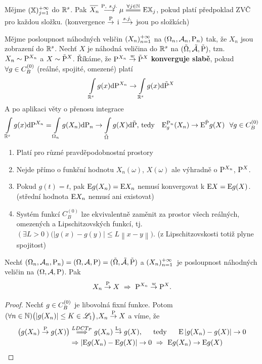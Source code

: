 \begin{remark}
	Mějme $(\mathbb{X})_{j=1}^{+\infty}$ do $\mathbb{R}^s$. Pak $\oxn \stackrel{\PP,~ s.j.}{\longrightarrow}\mu\equal{\forall j \in\N}\E \X_j$, pokud platí předpoklad ZVČ pro každou složku. (konvergence $\stackrel{\mathrm{P}}{\to}$ i $\stackrel{s.j.}{\longrightarrow}$ jsou po složkách)
\end{remark}
\begin{define}
	Mějme posloupnost náhodných veličin $(X_n)_{n=1}^{+\infty}$ na $(\Omega_n,\mathcal{A}_n,\mathrm{P}_n)$ tak, že $X_n$ jsou zobrazení do $\mathbb{R}^s$. Nechť $X$ je náhodná veličina do $\mathbb{R}^s$ na $(\tilde{\Omega},\tilde{\mathcal{A}},\tilde{\mathrm{P}})$, tzn. $X_n\sim \mathrm{P}^{X_n}$ a $X\sim \tilde{\mathrm{P}}^X$. Říkáme, že $\mathrm{P}^{X_n}\stackrel{w}{\to}\tilde{\mathrm{P}}^X$ \textbf{konverguje slabě}, pokud $\forall g \in C_B^{(0)}$ (reálné, spojité, omezené) platí 
	$$ \int\limits_{\mathbb{R}^s} g(x)\mathrm{d}\mathrm{P}^{X_n}\to \int\limits_{\mathbb{R}^s} g(x)\mathrm{d}\tilde{\mathrm{P}}^X $$
	A po aplikaci věty o přenosu integrace
	$$
	\int\limits_{\mathbb{R}^s} g(x)\mathrm{d}\mathrm{P}^{X_n}=\int\limits_{\Omega_n}g(X_n)\mathrm{d} \mathrm{P}_n\to\int\limits_{\tilde{\Omega}}g(X)\mathrm{d}\tilde{\mathrm{P}}\text{, tedy }~~
	\mathrm{E} _g^{\mathrm{P}_n}(X_n)\to \mathrm{E} ^{\tilde{\mathrm{P}}}g(X)~~\forall g\in C_B^{(0)}
$$
\end{define}
\begin{remark}
	\begin{enumerate}
		\item Platí pro různé pravděpodobnostní prostory 
		\item Nejde přímo o funkční hodnotu $X_n(\omega)$, $X(\omega)$ ale výhradně o $\mathrm{P}^{X_n}$, $\mathrm{P}^X$.
		\item Pokud $g(t)=t$, pak $\mathrm{E} g(X_n)=\mathrm{E} X_n$ nemusí konvergovat k $\mathrm{E} X=\mathrm{E} g(X)$. (střední hodnota $\mathrm{E} X_n$ nemusí ani existovat)
		\item Systém funkcí $C_B^{(0)}$ lze ekvivalentně zaměnit za prostor všech reálných, omezených a Lipschitzovských funkcí, tj. $(\exists L>0)\bigl( |g(x)-g(y)|\leq L\left\|x-y\right\| \bigr)$. (z Lipschitzovskosti totiž plyne spojitost)
	\end{enumerate}
\end{remark}
\begin{theorem}
	Nechť $(\Omega_n,\mathcal{A}_n,\mathrm{P}_n)=(\Omega,\mathcal{A},\mathrm{P})=(\tilde{\Omega},\tilde{\mathcal{A}},\tilde{\mathrm{P}})$ a $(X_n)_{n=1}^{+\infty}$~je posloupnost náhodných veličin na $(\Omega,\mathcal{A},\mathrm{P})$. Pak $$
	X_n\stackrel{\mathrm{P}}{\to} X~\Rightarrow~\mathrm{P}^{X_n}\stackrel{w}{\to} \mathrm{P}^X.
	$$
	\begin{proof}
		Nechť $g\in C_B^{(0)}$ je libovolná fixní funkce. Potom $(\forall n \in\mathbb{N})\bigl( |g(X_n)|\leq K\in\mathscr{L}_1 \bigr)$,\newline $X_n\stackrel{\mathrm{P}}{\to} X$ a víme, že \[
		\begin{split}
		\bigl( g(X_n)\stackrel{\mathrm{P}}{\to} g(X) \bigr)&\stackrel{LDCT_P}{\Longrightarrow}g(X_n)\stackrel{\mathrm{L}_1}{\to}g(X)\text{,~~~~ tedy ~~~~}\mathrm{E} \left| g(X_n)-g(X) \right|\to 0 \\
		&\Rightarrow \left| \mathrm{E} g(X_n)-\mathrm{E} g(X) \right|\to 0~\Rightarrow~\mathrm{E} g(X_n)\to \mathrm{E} g(X)
		\end{split}
		\]
	\end{proof}
\end{theorem}
